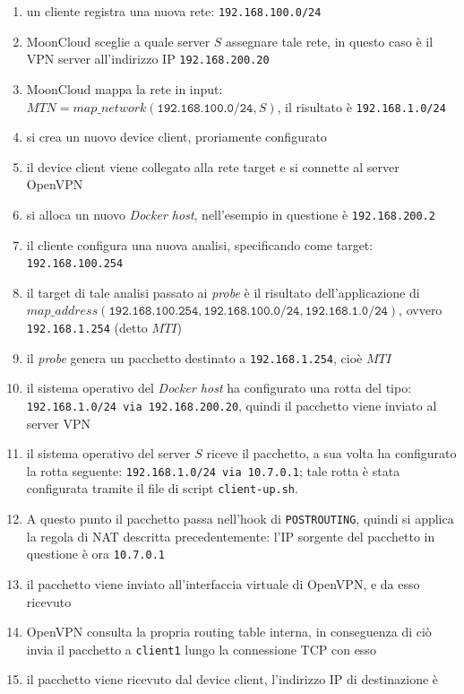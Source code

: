 \begin{enumerate}
  \item un cliente registra una nuova rete: \texttt{192.168.100.0/24}
  \item MoonCloud sceglie a quale server $S$ assegnare tale rete,
  in questo caso è il VPN server all'indirizzo IP \texttt{192.168.200.20}
  \item MoonCloud mappa la rete in input: $MTN=map\_network(\texttt{192.168.100.0/24}, S)$,
  il risultato è \texttt{192.168.1.0/24}
  \item si crea un nuovo device client, proriamente configurato
  \item il device client viene collegato alla rete target e si connette al server OpenVPN
  \item si alloca un nuovo \textit{Docker host}, nell'esempio in questione è \texttt{192.168.200.2}
  \item il cliente configura una nuova analisi, specificando come target: \texttt{192.168.100.254}
  \item il target di tale analisi passato ai \textit{probe} è il risultato dell'applicazione
  di $map\_address(\texttt{192.168.100.254}, \texttt{192.168.100.0/24}, \texttt{192.168.1.0/24})$,
  ovvero \texttt{192.168.1.254} (detto $MTI$)
  \item il \textit{probe} genera un pacchetto destinato a \texttt{192.168.1.254}, cioè $MTI$
  \item il sistema operativo del \textit{Docker host} ha configurato una rotta del tipo:
  \texttt{192.168.1.0/24 via 192.168.200.20}, quindi il pacchetto viene inviato al server VPN
  \item il sistema operativo del server $S$ riceve il pacchetto, a sua volta ha configurato
  la rotta seguente: \texttt{192.168.1.0/24 via 10.7.0.1}; tale rotta è stata configurata
  tramite il file di script \texttt{client-up.sh}.
  \item A questo punto il pacchetto passa nell'hook di \texttt{POSTROUTING}, quindi
  si applica la regola di NAT descritta precedentemente: l'IP sorgente del
  pacchetto in questione è ora \texttt{10.7.0.1}
  \item il pacchetto viene inviato all'interfaccia
  virtuale di OpenVPN, e da esso ricevuto
  \item OpenVPN consulta la propria routing table interna, in conseguenza di ciò
  invia il pacchetto a \texttt{client1} lungo la connessione TCP con esso
  \item il pacchetto viene ricevuto dal device client, l'indirizzo IP di destinazione è

\end{enumerate}

